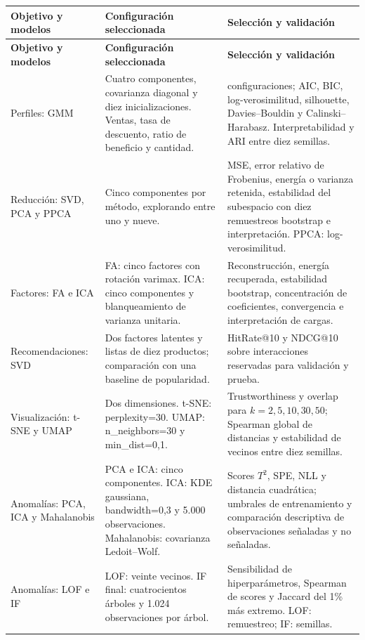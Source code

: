 \documentclass[11pt,a4paper]{article}
\begin{document}
\begingroup
\fontsize{9}{10.8}\selectfont
\setlength{\tabcolsep}{5pt}
\renewcommand{\arraystretch}{1.12}
\setlength{\LTpre}{0pt}
\setlength{\LTpost}{5pt}
\begin{longtable}{@{}>{\raggedright\arraybackslash}p{2.55cm}*{2}{>{\raggedright\arraybackslash}p{\dimexpr(\textwidth-2.55cm-4\tabcolsep)/2\relax}}@{}}
\toprule
\textbf{Objetivo y modelos} & \textbf{Configuración seleccionada} & \textbf{Selección y validación}\\
\midrule
\endfirsthead
\toprule
\textbf{Objetivo y modelos} & \textbf{Configuración seleccionada} & \textbf{Selección y validación}\\
\midrule
\endhead
\midrule
\endfoot
\bottomrule
\endlastfoot
Perfiles: GMM & Cuatro componentes, covarianza diagonal y diez inicializaciones. Ventas, tasa de descuento, ratio de beneficio y cantidad. & 32 configuraciones; AIC, BIC, log-verosimilitud, silhouette, Davies--Bouldin y Calinski--Harabasz. Interpretabilidad y ARI entre diez semillas.\\[4pt]
Reducción: SVD, PCA y PPCA & Cinco componentes por método, explorando entre uno y nueve. & MSE, error relativo de Frobenius, energía o varianza retenida, estabilidad del subespacio con diez remuestreos bootstrap e interpretación. PPCA: log-verosimilitud.\\[4pt]
Factores: FA e ICA & FA: cinco factores con rotación varimax. ICA: cinco componentes y blanqueamiento de varianza unitaria. & Reconstrucción, energía recuperada, estabilidad bootstrap, concentración de coeficientes, convergencia e interpretación de cargas.\\[4pt]
Recomendaciones: SVD & Dos factores latentes y listas de diez productos; comparación con una baseline de popularidad. & HitRate@10 y NDCG@10 sobre interacciones reservadas para validación y prueba.\\[4pt]
Visualización: t-SNE y UMAP & Dos dimensiones. t-SNE: perplexity=30. UMAP: n\_neighbors=30 y min\_dist=0,1. & Trustworthiness y overlap para $k=2,5,10,30,50$; Spearman global de distancias y estabilidad de vecinos entre diez semillas.\\[4pt]
Anomalías: PCA, ICA y Mahalanobis & PCA e ICA: cinco componentes. ICA: KDE gaussiana, bandwidth=0,3 y 5.000 observaciones. Mahalanobis: covarianza Ledoit--Wolf. & Scores $T^2$, SPE, NLL y distancia cuadrática; umbrales de entrenamiento y comparación descriptiva de observaciones señaladas y no señaladas.\\[4pt]
Anomalías: LOF e IF & LOF: veinte vecinos. IF final: cuatrocientos árboles y 1.024 observaciones por árbol. & Sensibilidad de hiperparámetros, Spearman de scores y Jaccard del 1\% más extremo. LOF: remuestreo; IF: semillas.\\[4pt]

\end{longtable}
\end{document}
